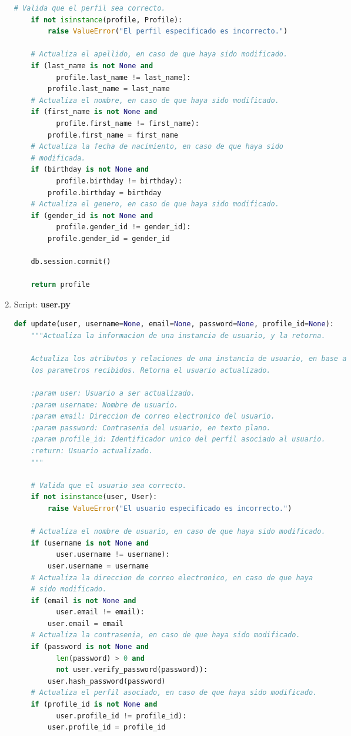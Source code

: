 \documentclass[a4paper,12pt]{article}
\begin{document}
\begin{enumerate}
\begin{lstlisting}[language=Python]
    # Valida que el perfil sea correcto.
    if not isinstance(profile, Profile):
        raise ValueError("El perfil especificado es incorrecto.")

    # Actualiza el apellido, en caso de que haya sido modificado.
    if (last_name is not None and
          profile.last_name != last_name):
        profile.last_name = last_name
    # Actualiza el nombre, en caso de que haya sido modificado.
    if (first_name is not None and
          profile.first_name != first_name):
        profile.first_name = first_name
    # Actualiza la fecha de nacimiento, en caso de que haya sido
    # modificada.
    if (birthday is not None and
          profile.birthday != birthday):
        profile.birthday = birthday
    # Actualiza el genero, en caso de que haya sido modificado.
    if (gender_id is not None and
          profile.gender_id != gender_id):
        profile.gender_id = gender_id

    db.session.commit()

    return profile
\end{lstlisting}

\item Script: \textbf{user.py}

\begin{lstlisting}[language=Python]
def update(user, username=None, email=None, password=None, profile_id=None):
    """Actualiza la informacion de una instancia de usuario, y la retorna.

    Actualiza los atributos y relaciones de una instancia de usuario, en base a
    los parametros recibidos. Retorna el usuario actualizado.

    :param user: Usuario a ser actualizado.
    :param username: Nombre de usuario.
    :param email: Direccion de correo electronico del usuario.
    :param password: Contrasenia del usuario, en texto plano.
    :param profile_id: Identificador unico del perfil asociado al usuario.
    :return: Usuario actualizado.
    """

    # Valida que el usuario sea correcto.
    if not isinstance(user, User):
        raise ValueError("El usuario especificado es incorrecto.")

    # Actualiza el nombre de usuario, en caso de que haya sido modificado.
    if (username is not None and
          user.username != username):
        user.username = username
    # Actualiza la direccion de correo electronico, en caso de que haya
    # sido modificado.
    if (email is not None and
          user.email != email):
        user.email = email
    # Actualiza la contrasenia, en caso de que haya sido modificado.
    if (password is not None and
          len(password) > 0 and
          not user.verify_password(password)):
        user.hash_password(password)
    # Actualiza el perfil asociado, en caso de que haya sido modificado.
    if (profile_id is not None and
          user.profile_id != profile_id):
        user.profile_id = profile_id


\end{lstlisting}
\end{enumerate}
\end{document}
